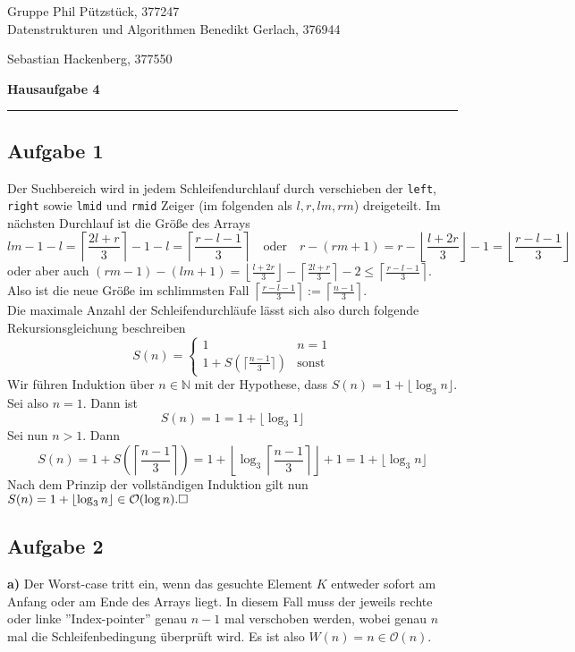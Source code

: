 \documentclass[a4paper,graphics,11pt]{article}
\newcommand{\aufgabe}[1]{\subsection*{Aufgabe #1}}
\begin{document}
\noindent Gruppe              \hfill Phil Pützstück, 377247\\
\noindent Datenstrukturen und Algorithmen \hfill Benedikt Gerlach, 376944\\
\strut\hfill Sebastian Hackenberg, 377550\\
\begin{center}
	\LARGE{\textbf{Hausaufgabe 4}}
\end{center}
\begin{center}
\rule[0.1ex]{\textwidth}{1pt}
\end{center}

\aufgabe{1}
Der Suchbereich wird in jedem Schleifendurchlauf durch verschieben der \texttt{left}, \texttt{right} sowie
\texttt{lmid} und \texttt{rmid} Zeiger (im folgenden als $l, r, lm, rm$) dreigeteilt. Im nächsten Durchlauf ist die Größe des Arrays
$$
    lm - 1 - l = \left\lceil \frac{2l + r}{3} \right\rceil -1 - l
    = \left\lceil \frac{r - l - 1}{3} \right\rceil
    \quad \text{oder}\quad
    r - (rm + 1) = r - \left\lfloor \frac{l + 2r}{3} \right\rfloor - 1
    = \left\lfloor \frac{r - l - 1}{3} \right\rfloor
$$
oder aber auch
$(rm - 1) - (lm + 1) = \left\lfloor \frac{l + 2r}{3} \right\rfloor - \left\lceil \frac{2l + r}{3} \right\rceil - 2
\leq \left\lceil \frac{r - l - 1}{3} \right\rceil$.\\
Also ist die neue Größe im schlimmsten Fall
$\left\lceil \frac{r - l - 1}{3} \right\rceil := \left\lceil\frac{n-1}{3}\right\rceil$.\\
Die maximale Anzahl der Schleifendurchläufe lässt sich also durch folgende Rekursionsgleichung beschreiben
$$
    S(n) = \begin{cases}
        1 & n = 1\\
        1 + S(\lceil\frac{n-1}{3}\rceil) & \text{sonst}
    \end{cases}
$$
Wir führen Induktion über $n \in \mathbb{N}$ mit der Hypothese, dass $S(n) = 1 + \lfloor\log_3 n\rfloor$.\\
Sei also $n = 1$. Dann ist
$$
    S(n) = 1 = 1 + \lfloor \log_3 1\rfloor
$$
Sei nun $n > 1$. Dann
$$
    S(n)
    = 1 + S\left(\left\lceil\frac{n-1}{3}\right\rceil\right)
    = 1 + \left\lfloor\log_3\left\lceil\frac{n-1}{3}\right\rceil\right\rfloor + 1
    = 1 + \lfloor \log_3 n\rfloor
$$
Nach dem Prinzip der vollständigen Induktion gilt nun $S(n) = 1 + \lfloor\log_3 n\rfloor \in \mathcal{O}(\log n).\hfill\square$
\aufgabe{2}
\textbf{a)}
Der Worst-case tritt ein, wenn das gesuchte Element $K$ entweder sofort am Anfang oder am Ende des
Arrays liegt. In diesem Fall muss der jeweils rechte oder linke ''Index-pointer'' genau $n-1$
mal verschoben werden, wobei genau $n$ mal die Schleifenbedingung überprüft wird.
Es ist also $W(n) = n\in \mathcal{O}(n)$.
\end{document}
